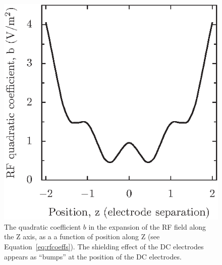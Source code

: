 \begin{figure}[!t]
\begin{center}
\includegraphics{chapter2/liverpool/liverpool_rf_quadcoeff_v2}
\end{center}
\caption[Axial component of fields generated by the RF electrodes]{
The quadratic coefficient $b$ in the expansion of the RF field along the Z axis, as a a function of position along Z (see Equation~\ref{eq:rfcoeffs}). The shielding effect of the DC electrodes appears as ``bumps'' at the position of the DC electrodes.
}
\label{fig:rfaxialquad}
\end{figure} 
